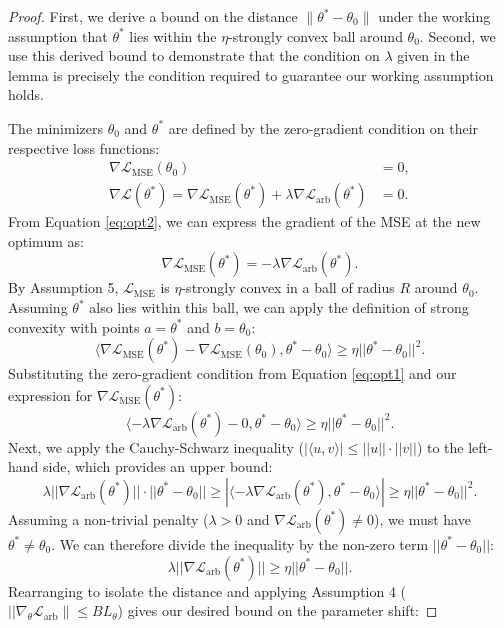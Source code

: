 \documentclass{article}
\begin{document}
\begin{proof}
First, we derive a bound on the distance $\|\theta^* - \theta_0\|$ under the working assumption that $\theta^*$ lies within the $\eta$-strongly convex ball around $\theta_0$. Second, we use this derived bound to demonstrate that the condition on $\lambda$ given in the lemma is precisely the condition required to guarantee our working assumption holds.

The minimizers $\theta_0$ and $\theta^*$ are defined by the zero-gradient condition on their respective loss functions:
\begin{align}
    \nabla \mathcal{L}_{\text{MSE}}(\theta_0) &= 0 \label{eq:opt1}, \\
    \nabla \mathcal{L}(\theta^*) = \nabla \mathcal{L}_{\text{MSE}}(\theta^*) + \lambda \nabla \mathcal{L}_{\text{arb}}(\theta^*) &= 0 \label{eq:opt2}.
\end{align}
From Equation \ref{eq:opt2}, we can express the gradient of the MSE at the new optimum as:
\[
\nabla \mathcal{L}_{\text{MSE}}(\theta^*) = -\lambda \nabla \mathcal{L}_{\text{arb}}(\theta^*).
\]
By Assumption 5, $\mathcal{L}_{\text{MSE}}$ is $\eta$-strongly convex in a ball of radius $R$ around $\theta_0$. Assuming $\theta^*$ also lies within this ball, we can apply the definition of strong convexity with points $a = \theta^*$ and $b = \theta_0$:
\[
\langle \nabla \mathcal{L}_{\text{MSE}}(\theta^*) - \nabla \mathcal{L}_{\text{MSE}}(\theta_0), \theta^* - \theta_0 \rangle \ge \eta ||\theta^* - \theta_0||^2.
\]
Substituting the zero-gradient condition from Equation \ref{eq:opt1} and our expression for $\nabla \mathcal{L}_{\text{MSE}}(\theta^*)$:
\[
\langle -\lambda \nabla \mathcal{L}_{\text{arb}}(\theta^*) - 0, \theta^* - \theta_0 \rangle \ge \eta ||\theta^* - \theta_0||^2.
\]
Next, we apply the Cauchy-Schwarz inequality ($|\langle u, v \rangle| \le ||u|| \cdot ||v||$) to the left-hand side, which provides an upper bound:
\[
\lambda ||\nabla \mathcal{L}_{\text{arb}}(\theta^*)|| \cdot ||\theta^* - \theta_0|| \ge |\langle -\lambda \nabla \mathcal{L}_{\text{arb}}(\theta^*), \theta^* - \theta_0 \rangle| \ge \eta ||\theta^* - \theta_0||^2.
\]
Assuming a non-trivial penalty ($\lambda > 0$ and $\nabla \mathcal{L}_{\text{arb}}(\theta^*) \neq 0$), we must have $\theta^* \ne \theta_0$. We can therefore divide the inequality by the non-zero term $||\theta^* - \theta_0||$:
\[
\lambda ||\nabla \mathcal{L}_{\text{arb}}(\theta^*)|| \ge \eta ||\theta^* - \theta_0||.
\]
Rearranging to isolate the distance and applying Assumption 4 ($||\nabla_\theta \mathcal{L}_{\text{arb}}\| \le B L_\theta$) gives our desired bound on the parameter shift:

\end{proof}
\end{document}
